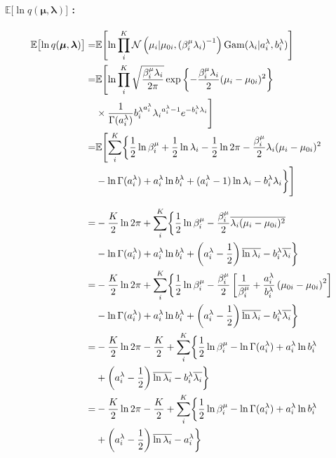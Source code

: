 \paragraph{$\mathbb{E}\bigl[\ln q({\boldsymbol \mu}, {\boldsymbol \lambda}) \bigr]$ : }
\begin{align}
  \mathbb{E}\bigl[\ln q({\boldsymbol \mu}, {\boldsymbol \lambda}) \bigr]  =&  
    \mathbb{E}\Biggl[ \ln \prod_i^K  \mathcal{N}\left(\mu_i | \mu_{0i}, \left( \beta_i^\mu \lambda_i \right)^{-1}\right) {\rm Gam}(\lambda_i | a_i^\lambda, b_i^\lambda)  \Biggr]  \\
%
    =&  \mathbb{E}\Biggl[ \ln \prod_i^K \sqrt{ \frac{ \beta_i^\mu \lambda_i }{ 2 \pi }} \exp\left\{ - \frac{\beta_i^\mu \lambda_i}{2} (\mu_i - \mu_{0i})^2 \right\}  \notag  \\  
      &  \times \frac{ 1 }{ \Gamma(a_i^\lambda) } {b_i^\lambda}^{a_i^\lambda} {\lambda_i}^{a_i^\lambda - 1} e^{-b_i^\lambda \lambda_i} \Biggr]  \\
%
  =&  \mathbb{E}\Biggl[ \sum_i^K \biggl\{  
      \frac{1}{2} \ln \beta_i^\mu + \frac{1}{2} \ln \lambda_i - \frac{1}{2} \ln 2 \pi - \frac{\beta_i^\mu}{2} \lambda_i (\mu_i - \mu_{0i})^2  \notag  \\
      &  - \ln \Gamma(a_i^\lambda) + a_i^\lambda \ln b_i^\lambda + (a_i^\lambda - 1) \ln \lambda_i - b_i^\lambda \lambda_i  
    \biggr\} \Biggr]  \\
%
\intertext{}
%
  =&  - \frac{K}{2} \ln 2 \pi + \sum_i^K \biggl\{  
      \frac{1}{2} \ln \beta_i^\mu - \frac{\beta_i^\mu}{2} \overline{\lambda_i (\mu_i - \mu_{0i})^2}  \notag  \\
      &  - \ln \Gamma(a_i^\lambda) + a_i^\lambda \ln b_i^\lambda + \left( a_i^\lambda - \frac{1}{2} \right) \overline{\ln \lambda_i} - b_i^\lambda \overline{\lambda_i}  
    \biggr\}  \\
%
  =&  - \frac{K}{2} \ln 2 \pi + \sum_i^K \biggl\{  
      \frac{1}{2} \ln \beta_i^\mu - \frac{\beta_i^\mu}{2} \left[ \frac{1}{\beta_i^\mu} + \frac{a_i^\lambda}{b_i^\lambda} \left( \mu_{0i} - \mu_{0i} \right)^2 \right]  \notag  \\
      &  - \ln \Gamma(a_i^\lambda) + a_i^\lambda \ln b_i^\lambda + \left( a_i^\lambda - \frac{1}{2} \right) \overline{\ln \lambda_i} - b_i^\lambda \overline{\lambda_i}  
    \biggr\}  \\
%
  =&  - \frac{K}{2} \ln 2 \pi - \frac{K}{2} + \sum_i^K \biggl\{  
      \frac{1}{2} \ln \beta_i^\mu  
        - \ln \Gamma(a_i^\lambda) + a_i^\lambda \ln b_i^\lambda  \notag  \\  
    &  + \left( a_i^\lambda - \frac{1}{2} \right) \overline{\ln \lambda_i} - b_i^\lambda \overline{\lambda_i}  
    \biggr\}  \\
%
  =&  - \frac{K}{2} \ln 2 \pi - \frac{K}{2} + \sum_i^K \biggl\{  
      \frac{1}{2} \ln \beta_i^\mu  
        - \ln \Gamma(a_i^\lambda) + a_i^\lambda \ln b_i^\lambda  \notag  \\  
    &  + \left( a_i^\lambda - \frac{1}{2} \right) \overline{\ln \lambda_i} - a_i^\lambda  
    \biggr\}  
\end{align}

%
